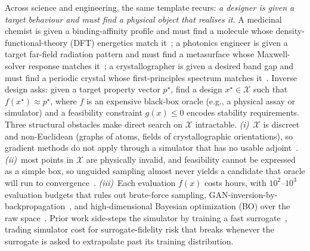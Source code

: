 \documentclass{article}
\newcommand{\X}{\mathcal{X}}
\begin{document}
Across science and engineering, the same template recurs: \emph{a designer is given a target behaviour and must find a physical object that realises it}. A medicinal chemist is given a binding-affinity profile and must find a molecule whose density-functional-theory (DFT) energetics match it~\citep{gomez2018, Yoo2023,Axelrod2022}; a photonics engineer is given a target far-field radiation pattern and must find a metasurface whose Maxwell-solver response matches it~\citep{Molesky2018,Zhou2021}; a crystallographer is given a desired band gap and must find a periodic crystal whose first-principles spectrum matches it~\citep{xie2022,zeni2025,jiao2023}. Inverse design asks: given a target property vector $p^\star$, find a design $x^\star \in \X$ such that $f(x^\star) \approx p^\star$, where $f$ is an expensive black-box oracle (e.g., a physical assay or simulator) and a feasibility constraint $g(x) \le 0$ encodes stability requirements. Three structural obstacles make direct search on $\X$ intractable. \emph{(i)}~$\X$ is discreet and non-Euclidean (graphs of atoms, fields of crystallographic orientations), so gradient methods do not apply through a simulator that has no usable adjoint~\citep{Liu2023}. \emph{(ii)}~most points in $\X$ are physically invalid, and feasibility cannot be expressed as a simple box, so unguided sampling almost never yields a candidate that oracle will run to convergence~\citep{Lu_2022}. \emph{(iii)}~Each evaluation $f(x)$ costs hours, with $10^2$--$10^3$ evaluation budgets that rules out brute-force sampling, GAN-inversion-by-backpropagation~\citep{creswell2018,li2026towards}, and high-dimensional Bayesian optimization (BO) over the raw space~\citep{eriksson2019,papenmeier2022, Frazier_2015}. Prior work side-steps the simulator by training a fast surrogate~\citep{yang2018,cang2018,xie2022,zeni2025}, trading simulator cost for surrogate-fidelity risk that breaks whenever the surrogate is asked to extrapolate past its training distribution.
\end{document}
